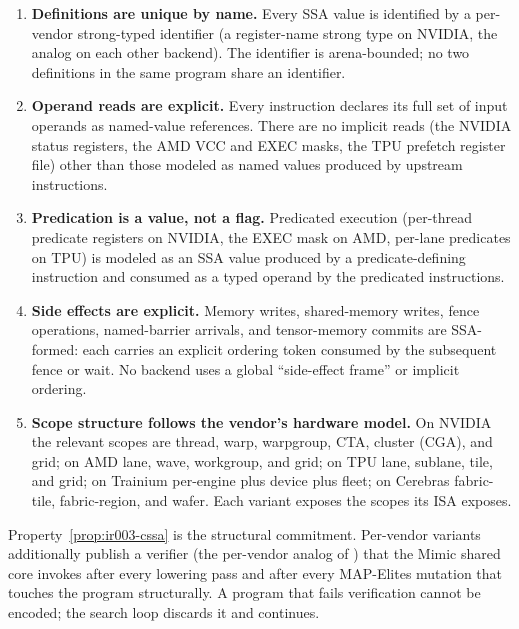 \begin{enumerate}
  \item \textbf{Definitions are unique by name.}
        Every SSA value is identified by a per-vendor strong-typed identifier (a register-name strong type on NVIDIA, the analog on each other backend).
        The identifier is arena-bounded; no two definitions in the same program share an identifier.

  \item \textbf{Operand reads are explicit.}
        Every instruction declares its full set of input operands as named-value references.
        There are no implicit reads (the NVIDIA status registers, the AMD VCC and EXEC masks, the TPU prefetch register file) other than those modeled as named values produced by upstream instructions.

  \item \textbf{Predication is a value, not a flag.}
        Predicated execution (per-thread predicate registers on NVIDIA, the EXEC mask on AMD, per-lane predicates on TPU) is modeled as an SSA value produced by a predicate-defining instruction and consumed as a typed operand by the predicated instructions.

  \item \textbf{Side effects are explicit.}
        Memory writes, shared-memory writes, fence operations, named-barrier arrivals, and tensor-memory commits are SSA-formed: each carries an explicit ordering token consumed by the subsequent fence or wait.
        No backend uses a global ``side-effect frame'' or implicit ordering.

  \item \textbf{Scope structure follows the vendor's hardware model.}
        On NVIDIA the relevant scopes are thread, warp, warpgroup, CTA, cluster (CGA), and grid; on AMD lane, wave, workgroup, and grid; on TPU lane, sublane, tile, and grid; on Trainium per-engine plus device plus fleet; on Cerebras fabric-tile, fabric-region, and wafer.
        Each  variant exposes the scopes its ISA exposes.
\end{enumerate}

Property~\ref{prop:ir003-cssa} is the structural commitment.
Per-vendor variants additionally publish a verifier (the per-vendor analog of ) that the Mimic shared core invokes after every lowering pass and after every MAP-Elites mutation that touches the program structurally.
A program that fails verification cannot be encoded; the search loop discards it and continues.

